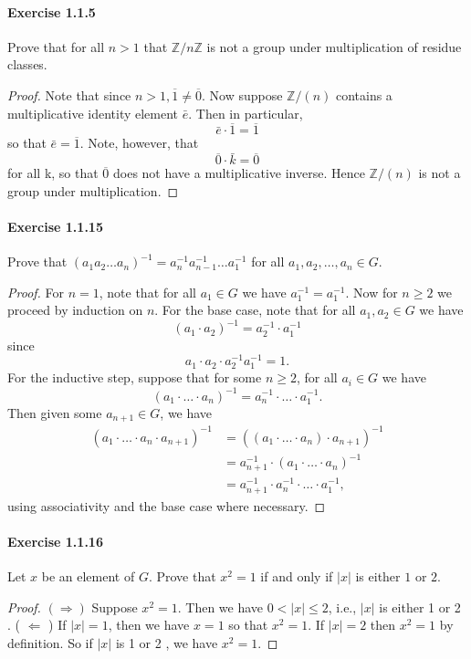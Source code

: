 \documentclass{article}
\theoremstyle{definition}
\begin{document}
\paragraph{Exercise 1.1.5} Prove that for all $n>1$ that $\mathbb{Z}/n\mathbb{Z}$ is not a group under multiplication of residue classes.
\begin{proof}
    Note that since $n>1, \overline{1} \neq \overline{0}$. Now suppose $\mathbb{Z} /(n)$ contains a multiplicative identity element $\bar{e}$. Then in particular,
$$
\bar{e} \cdot \overline{1}=\overline{1}
$$
so that $\bar{e}=\overline{1}$. Note, however, that
$$
\overline{0} \cdot \bar{k}=\overline{0}
$$
for all k, so that $\overline{0}$ does not have a multiplicative inverse. Hence $\mathbb{Z} /(n)$ is not a group under multiplication.
\end{proof}



\paragraph{Exercise 1.1.15} Prove that $(a_1a_2\dots a_n)^{-1} = a_n^{-1}a_{n-1}^{-1}\dots a_1^{-1}$ for all $a_1, a_2, \dots, a_n\in G$.
\begin{proof}
    For $n=1$, note that for all $a_1 \in G$ we have $a_1^{-1}=a_1^{-1}$.
Now for $n \geq 2$ we proceed by induction on $n$. For the base case, note that for all $a_1, a_2 \in G$ we have
$$
\left(a_1 \cdot a_2\right)^{-1}=a_2^{-1} \cdot a_1^{-1}
$$
since
$$
a_1 \cdot a_2 \cdot a_2^{-1} a_1^{-1}=1 .
$$
For the inductive step, suppose that for some $n \geq 2$, for all $a_i \in G$ we have
$$
\left(a_1 \cdot \ldots \cdot a_n\right)^{-1}=a_n^{-1} \cdot \ldots \cdot a_1^{-1} .
$$
Then given some $a_{n+1} \in G$, we have
$$
\begin{aligned}
\left(a_1 \cdot \ldots \cdot a_n \cdot a_{n+1}\right)^{-1} &=\left(\left(a_1 \cdot \ldots \cdot a_n\right) \cdot a_{n+1}\right)^{-1} \\
&=a_{n+1}^{-1} \cdot\left(a_1 \cdot \ldots \cdot a_n\right)^{-1} \\
&=a_{n+1}^{-1} \cdot a_n^{-1} \cdot \ldots \cdot a_1^{-1},
\end{aligned}
$$
using associativity and the base case where necessary.
\end{proof}



\paragraph{Exercise 1.1.16} Let $x$ be an element of $G$. Prove that $x^2=1$ if and only if $|x|$ is either $1$ or $2$.
\begin{proof}
    $(\Rightarrow)$ Suppose $x^2=1$. Then we have $0<|x| \leq 2$, i.e., $|x|$ is either 1 or 2 .
( $\Leftarrow$ ) If $|x|=1$, then we have $x=1$ so that $x^2=1$. If $|x|=2$ then $x^2=1$ by definition. So if $|x|$ is 1 or 2 , we have $x^2=1$.
\end{proof}
\end{document}
